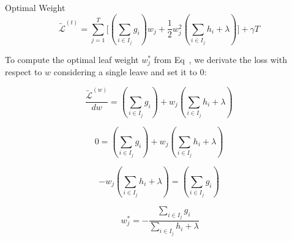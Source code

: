 \documentclass{beamer}
\begin{document}
\begin{frame}{Optimal Weight}
	\begin{equation}
	\label{eq:optimal_w}
	\tilde{\mathcal{L}}^{(t)} = \sum_{j=1}^{T}
	\big[ 
	(\sum_{i \in I_j}g_i ) w_j + 
	\frac{1}{2} w_j^2 (\sum_{i \in I_j} h_i + \lambda)
	\big]
	+ \gamma T
	\end{equation}

To compute the optimal leaf weight $w_j^*$ from Eq~, we derivate the loss with respect to $w$ considering a single leave and set it to $0$:

\begin{equation*}
	\frac{\tilde{\mathcal{L}}^{(w)}}{d w} = 
	(\sum_{i \in I_j}g_i ) + w_j (\sum_{i \in I_j} h_i + \lambda)
\end{equation*}

\begin{equation*}
0 = (\sum_{i \in I_j}g_i ) + w_j (\sum_{i \in I_j} h_i + \lambda)
\end{equation*}

\begin{equation*}
- w_j (\sum_{i \in I_j} h_i + \lambda) = (\sum_{i \in I_j}g_i ) 
\end{equation*}

\begin{equation}~\label{eq:weight}
 w^*_j= - \frac{\sum_{i \in I_j}g_i}{\sum_{i \in I_j} h_i + \lambda}
\end{equation}

\end{frame}

%	
%	
%	
\end{document}
